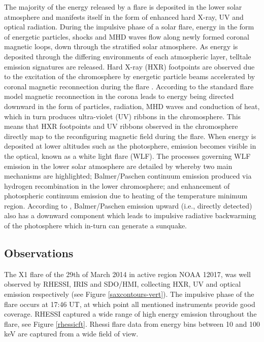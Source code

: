 The majority of the energy released by a flare is deposited in the lower solar atmosphere and manifests itself in the form of enhanced hard X-ray, UV and optical radiation. During the impulsive phase of a solar flare, energy in the form of energetic particles, shocks and MHD waves flow along newly formed coronal magnetic loops, down through the stratified solar atmosphere. As energy is deposited through the differing environments of each atmospheric layer, telltale emission signatures are released. Hard X-ray (HXR) footpoints are observed due to the excitation of the chromosphere by energetic particle beams accelerated by coronal magnetic reconnection during the flare \citep{1995ApJ...455..347A}. According to the standard flare model \citep{1964NASSP..50..451C, 1966Natur.211..695S, 1974SoPh...34..323H, 1976SoPh...50...85K} magnetic reconnection in the corona leads to energy being directed downward in the form of particles, radiation, MHD waves and conduction of heat, which in turn produces ultra-violet (UV) ribbons in the chromosphere. This means that HXR footpoints and UV ribbons observed in the chromosphere directly map to the reconfiguring magnetic field during the flare. When energy is deposited at lower altitudes such as the photosphere, emission becomes visible in the optical, known as a white light flare (WLF). The processes governing WLF emission in the lower solar atmosphere are detailed by \cite{2007ASPC..368..417D} whereby two main mechanisms are highlighted; Balmer/Paschen continuum emission produced via hydrogen recombination in the lower chromosphere; and enhancement of photospheric continuum emission due to heating of the temperature minimum region. According to \cite{1989SoPh..124..303M}, Balmer/Paschen emission upward (i.e., directly detected) also has a downward component which leads to impulsive radiative backwarming of the photosphere which in-turn can generate a sunquake.




\subsection{Observations}
The X1 flare of the 29th of March 2014 in active region NOAA 12017, was well observed by RHESSI, IRIS and SDO/HMI, collecting HXR, UV and optical emission respectively (see Figure \ref{saxcontours-vert}). The impulsive phase of the flare occurs at 17:46 UT, at which point all mentioned instruments provide good coverage. RHESSI captured a wide range of high energy emission throughout the flare, see Figure \ref{rhessicft}. Rhessi flare data from energy bins between 10 and 100 keV are captured from a wide field of view.%

